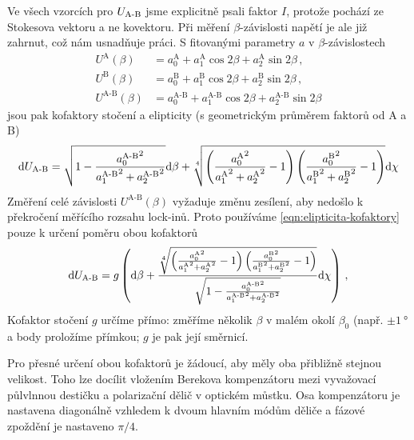 Ve všech vzorcích pro $U_\textrm{A-B}$ jsme explicitně psali faktor $I$, protože pochází ze Stokesova vektoru a ne kovektoru.
Při měření $\beta$-závislosti napětí je ale již zahrnut, což nám usnadňuje práci.
S fitovanými parametry $a$ v $\beta$-závislostech
\begin{align}
    U^\textrm{A}(\beta) &= a^\textrm{A}_0 + a^\textrm{A}_1 \cos2\beta + a^\textrm{A}_2 \sin2\beta \,,\\
    U^\textrm{B}(\beta) &= a^\textrm{B}_0 + a^\textrm{B}_1 \cos2\beta + a^\textrm{B}_2 \sin2\beta \,,\\
    U^\textrm{A-B}(\beta) &= a^\textrm{A-B}_0 + a^\textrm{A-B}_1 \cos2\beta + a^\textrm{A-B}_2 \sin2\beta
\end{align}
jsou pak kofaktory stočení a elipticity (s geometrickým průměrem faktorů od A a B)
\begin{equation}
\label{eqn:elipticita-kofaktory}
\textrm{d}U_\textrm{A-B} = \sqrt{1-\frac{{a^\textrm{A-B}_0}^2}{{a^\textrm{A-B}_1}^2+{a^\textrm{A-B}_2}^2}}\textrm{d}\beta 
+ \sqrt[4]{\left(\frac{{a^\textrm{A}_0}^2}{{a^\textrm{A}_1}^2+{a^\textrm{A}_2}^2}-1 \right)\left(\frac{{a^\textrm{B}_0}^2}{{a^\textrm{B}_1}^2+{a^\textrm{B}_2}^2}-1 \right)}\textrm{d}\chi
\end{equation}
Změření celé závislosti $U^\textrm{A-B}(\beta)$ vyžaduje změnu zesílení, aby nedošlo k překročení měřícího rozsahu lock-inů.
Proto používáme \eqref{eqn:elipticita-kofaktory} pouze k určení poměru obou kofaktorů
\begin{equation}
    \textrm{d}U_\textrm{A-B} = g \left( \textrm{d}\beta + \frac{\sqrt[4]{\left(\frac{{a^\textrm{A}_0}^2}{{a^\textrm{A}_1}^2+{a^\textrm{A}_2}^2}-1 \right)\left(\frac{{a^\textrm{B}_0}^2}{{a^\textrm{B}_1}^2+{a^\textrm{B}_2}^2}-1 \right)}}{\sqrt{1-\frac{{a^\textrm{A-B}_0}^2}{{a^\textrm{A-B}_1}^2+{a^\textrm{A-B}_2}^2}}}\textrm{d}\chi \right) \,,
\end{equation}
Kofaktor stočení $g$ určíme přímo: změříme několik $\beta$ v malém okolí $\beta_0$ (např. $\pm\SI{1}{\degree}$ a body proložíme přímkou; $g$ je pak její směrnicí.

Pro přesné určení obou kofaktorů je žádoucí, aby měly oba přibližně stejnou velikost.
Toho lze docílit vložením Berekova kompenzátoru mezi vyvažovací půlvlnnou destičku a polarizační dělič v optickém můstku.
Osa kompenzátoru je nastavena diagonálně vzhledem k dvoum hlavním módům děliče a fázové zpoždění je nastaveno $\pi/4$.

